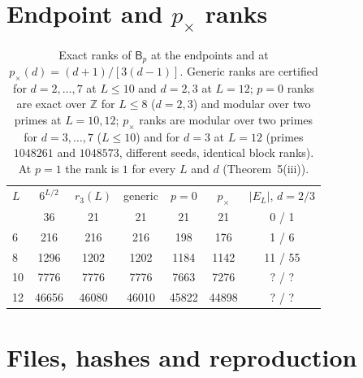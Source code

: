 \documentclass[aps,prx,reprint,superscriptaddress,nobibnotes,longbibliography]{revtex4-2}
\begin{document}
\section{Endpoint and $p_\times$ ranks}
\label{sm:endpoints}

\begin{table}[h]
\caption{Exact ranks of $\mathsf B_p$ at the endpoints and at $p_\times(d)=(d+1)/[3(d-1)]$.  Generic ranks are certified for $d=2,\ldots,7$ at $L\le10$ and $d=2,3$ at $L=12$; $p=0$ ranks are exact over $\mathbb Z$ for $L\le8$ ($d=2,3$) and modular over two primes at $L=10,12$; $p_\times$ ranks are modular over two primes for $d=3,\ldots,7$ ($L\le10$) and for $d=3$ at $L=12$ (primes $1048261$ and $1048573$, different seeds, identical block ranks).  At $p=1$ the rank is $1$ for every $L$ and $d$ (Theorem~5(iii)).}
\label{tab:S6}
\small
\begin{ruledtabular}
\begin{tabular}{lcccccc}
$L$ & $6^{L/2}$ & $r_3(L)$ & generic & $p=0$ & $p_\times$ & $|E_L|$, $d=2/3$\\
\colrule
4 & 36 & 21 & 21 & 21 & 21 & 0 / 1\\
6 & 216 & 216 & 216 & 198 & 176 & 1 / 6\\
8 & 1296 & 1202 & 1202 & 1184 & 1142 & 11 / 55\\
10 & 7776 & 7776 & 7776 & 7663 & 7276 & ? / ?\\
12 & 46656 & 46080 & 46010 & 45822 & 44898 & ? / ?\\
\end{tabular}
\end{ruledtabular}
\end{table}

\section{Files, hashes and reproduction}
\label{sm:files}
\end{document}
